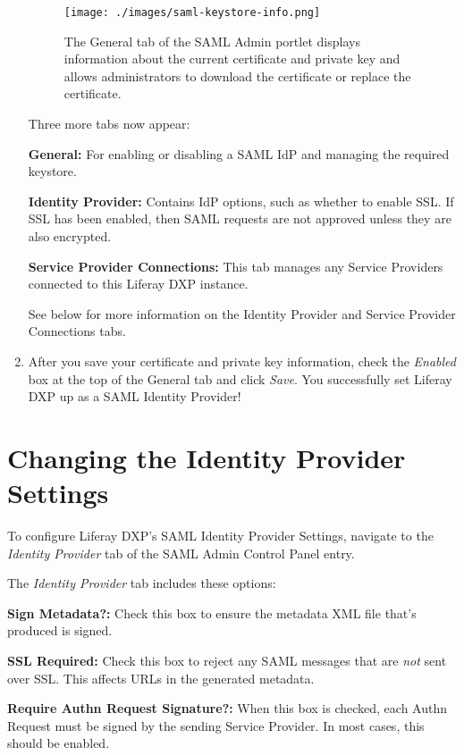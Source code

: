 \begin{enumerate}
  \begin{figure}
  \centering
  \texttt{[image: ./images/saml-keystore-info.png]}
  \caption{The General tab of the SAML Admin portlet displays
  information about the current certificate and private key and allows
  administrators to download the certificate or replace the
  certificate.}
  \end{figure}

  Three more tabs now appear:

  \textbf{General:} For enabling or disabling a SAML IdP and managing
  the required keystore.

  \textbf{Identity Provider:} Contains IdP options, such as whether to
  enable SSL. If SSL has been enabled, then SAML requests are not
  approved unless they are also encrypted.

  \textbf{Service Provider Connections:} This tab manages any Service
  Providers connected to this Liferay DXP instance.

  See below for more information on the Identity Provider and Service
  Provider Connections tabs.
\item
  After you save your certificate and private key information, check the
  \emph{Enabled} box at the top of the General tab and click
  \emph{Save}. You successfully set Liferay DXP up as a SAML Identity
  Provider!
\end{enumerate}

\section{Changing the Identity Provider
Settings}\label{changing-the-identity-provider-settings}

To configure Liferay DXP's SAML Identity Provider Settings, navigate to
the \emph{Identity Provider} tab of the SAML Admin Control Panel entry.

The \emph{Identity Provider} tab includes these options:

\textbf{Sign Metadata?:} Check this box to ensure the metadata XML file
that's produced is signed.

\textbf{SSL Required:} Check this box to reject any SAML messages that
are \emph{not} sent over SSL. This affects URLs in the generated
metadata.

\textbf{Require Authn Request Signature?:} When this box is checked,
each Authn Request must be signed by the sending Service Provider. In
most cases, this should be enabled.


